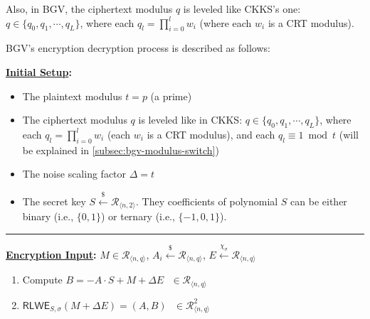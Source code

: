 Also, in BGV, the ciphertext modulus $q$ is leveled like CKKS's one: $q \in \{q_0, q_1, \cdots, q_L\}$, where each $q_l = \prod\limits_{i=0}^l w_i$ (where each $w_i$ is a CRT modulus). 

BGV's encryption decryption process is described as follows:


\begin{tcolorbox}[title={\textbf{\tboxlabel{\ref*{subsec:bgv-enc-dec}} BGV Encryption and Decryption}}]

\textbf{\underline{Initial Setup}:} 

\begin{itemize}
\item The plaintext modulus $t = p$ (a prime)

\item The ciphertext modulus $q$ is leveled like in CKKS: $q \in \{q_0, q_1, \cdots, q_L\}$, where each $q_l = \prod\limits_{i=0}^l w_i$ (each $w_i$ is a CRT modulus), and each $q_l \equiv 1 \bmod t$ (will be explained in \autoref{subsec:bgv-modulus-switch})

\item The noise scaling factor $\Delta=t$ 
\item The secret key $S \xleftarrow{\$} \mathcal{R}_{\langle n, 2 \rangle}$. They coefficients of polynomial $S$ can be either binary (i.e., $\{0, 1\}$) or ternary (i.e., $\{-1, 0, 1\}$).

\end{itemize}

\par\noindent\rule{\textwidth}{0.4pt}

\textbf{\underline{Encryption Input}:} $M \in \mathcal{R}_{\langle n, q \rangle}$, $A_i \xleftarrow{\$} \mathcal{R}_{\langle n, q \rangle}$, $E \xleftarrow{\chi_\sigma} \mathcal{R}_{\langle n, q \rangle}$


\begin{enumerate}

\item Compute $B = -A \cdot S + M + \Delta E \text{ } \in \mathcal{R}_{\langle n,q \rangle}$

\item $\textsf{RLWE}_{S,\sigma}(M + \Delta E) = (A, B) \text{ } \in \mathcal{R}_{\langle n,q \rangle}^2$ 

\end{enumerate}


\end{tcolorbox}
